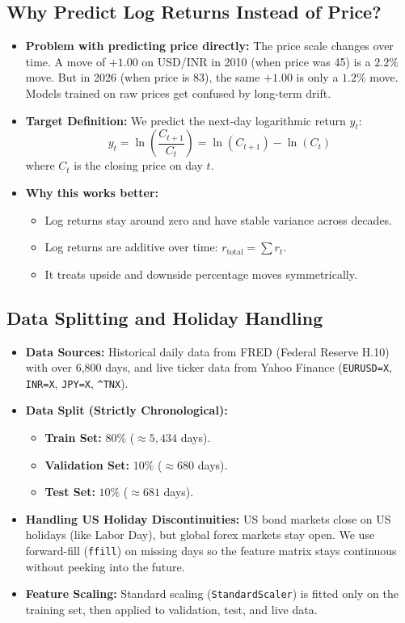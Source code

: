 \subsection{Why Predict Log Returns Instead of Price?}
\begin{itemize}[leftmargin=1.5cm, itemsep=1pt]
	\item \textbf{Problem with predicting price directly:} The price scale changes over time. A move of $+1.00$ on USD/INR in 2010 (when price was 45) is a $2.2\%$ move. But in 2026 (when price is 83), the same $+1.00$ is only a $1.2\%$ move. Models trained on raw prices get confused by long-term drift.
	\item \textbf{Target Definition:} We predict the next-day logarithmic return $y_t$:
	\begin{equation}
		y_t = \ln\left(\frac{C_{t+1}}{C_t}\right) = \ln(C_{t+1}) - \ln(C_t)
	\end{equation}
	where $C_t$ is the closing price on day $t$.
	\item \textbf{Why this works better:}
	\begin{itemize}
		\item Log returns stay around zero and have stable variance across decades.
		\item Log returns are additive over time: $r_{\text{total}} = \sum r_t$.
		\item It treats upside and downside percentage moves symmetrically.
	\end{itemize}
\end{itemize}

\subsection{Data Splitting and Holiday Handling}
\begin{itemize}[leftmargin=1.5cm, itemsep=1pt]
	\item \textbf{Data Sources:} Historical daily data from FRED (Federal Reserve H.10) with over 6,800 days, and live ticker data from Yahoo Finance (\texttt{EURUSD=X}, \texttt{INR=X}, \texttt{JPY=X}, \texttt{\textasciicircum TNX}).
	\item \textbf{Data Split (Strictly Chronological):}
	\begin{itemize}
		\item \textbf{Train Set:} $80\%$ ($\approx 5,434$ days).
		\item \textbf{Validation Set:} $10\%$ ($\approx 680$ days).
		\item \textbf{Test Set:} $10\%$ ($\approx 681$ days).
	\end{itemize}
	\item \textbf{Handling US Holiday Discontinuities:} US bond markets close on US holidays (like Labor Day), but global forex markets stay open. We use forward-fill (\texttt{ffill}) on missing days so the feature matrix stays continuous without peeking into the future.
	\item \textbf{Feature Scaling:} Standard scaling (\texttt{StandardScaler}) is fitted only on the training set, then applied to validation, test, and live data.
\end{itemize}

